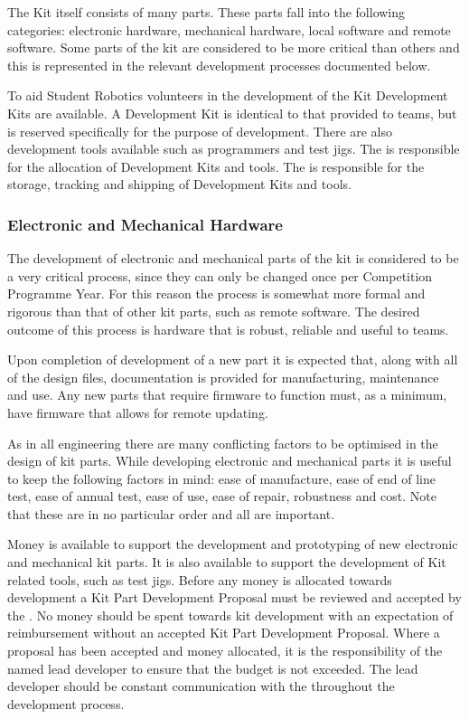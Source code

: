 \begin{draft}
The Kit itself consists of many parts. These parts fall into the following categories: electronic hardware, mechanical hardware, local software and remote software. Some parts of the kit are considered to be more critical than others and this is represented in the relevant development processes documented below.

To aid Student Robotics volunteers in the development of the Kit Development Kits are available. A Development Kit is identical to that provided to teams, but is reserved specifically for the purpose of development. There are also development tools available such as programmers and test jigs. The  is responsible for the allocation of Development Kits and tools. The  is responsible for the storage, tracking and shipping of Development Kits and tools.

\subsubsection{Electronic and Mechanical Hardware}

The development of electronic and mechanical parts of the kit is considered to be a very critical process, since they can only be changed once per Competition Programme Year. For this reason the process is somewhat more formal and rigorous than that of other kit parts, such as remote software. The desired outcome of this process is hardware that is robust, reliable and useful to teams.

Upon completion of development of a new part it is expected that, along with all of the design files, documentation is provided for manufacturing, maintenance and use. Any new parts that require firmware to function must, as a minimum, have firmware that allows for remote updating.

As in all engineering there are many conflicting factors to be optimised in the design of kit parts. While developing electronic and mechanical parts it is useful to keep the following factors in mind: ease of manufacture, ease of end of line test, ease of annual test, ease of use, ease of repair, robustness and cost. Note that these are in no particular order and all are important.

Money is available to support the development and prototyping of new electronic and mechanical kit parts. It is also available to support the development of Kit related tools, such as test jigs. Before any money is allocated towards development a Kit Part Development Proposal must be reviewed and accepted by the . No money should be spent towards kit development with an expectation of reimbursement without an accepted Kit Part Development Proposal. Where a proposal has been accepted and money allocated, it is the responsibility of the named lead developer to ensure that the budget is not exceeded. The lead developer should be constant communication with the  throughout the development process.


\end{draft}
